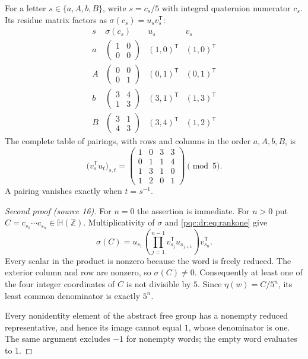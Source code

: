 \documentclass[11pt,letterpaper]{article}
\numberwithin{equation}{section}
\theoremstyle{definition}
\theoremstyle{remark}
\newcommand{\Z}{\mathbb Z}
\newcommand{\HH}{\mathbb H}
\begin{document}
For a letter $s\in\{a,A,b,B\}$, write $s=c_s/5$ with integral
quaternion numerator $c_s$. Its residue matrix factors as
$\sigma(c_s)=u_sv_s^{\mathsf T}$:
\begin{equation}
\begin{array}{c|c|c|c}
s&\sigma(c_s)&u_s&v_s\\ \hline
 a&\left(\begin{smallmatrix}1&0\\0&0\end{smallmatrix}\right)&(1,0)^{\mathsf T}&(1,0)^{\mathsf T}\\
 A&\left(\begin{smallmatrix}0&0\\0&1\end{smallmatrix}\right)&(0,1)^{\mathsf T}&(0,1)^{\mathsf T}\\
 b&\left(\begin{smallmatrix}3&4\\1&3\end{smallmatrix}\right)&(3,1)^{\mathsf T}&(1,3)^{\mathsf T}\\
 B&\left(\begin{smallmatrix}3&1\\4&3\end{smallmatrix}\right)&(3,4)^{\mathsf T}&(1,2)^{\mathsf T}
\end{array}
\label{pqc:dr:eq:rankone}
\end{equation}
The complete table of pairings, with rows and columns in the order
$a,A,b,B$, is
\begin{equation}
 \bigl(v_s^{\mathsf T}u_t\bigr)_{s,t}=
 \begin{pmatrix}
 1&0&3&3\\
 0&1&1&4\\
 1&3&1&0\\
 1&2&0&1
 \end{pmatrix}\pmod5.
 \label{pqc:dr:eq:pairings}
\end{equation}
A pairing vanishes exactly when $t=s^{-1}$.
\begin{proof}[Second proof (source 16)]
For $n=0$ the assertion is immediate. For $n>0$ put
$C=c_{s_1}\cdots c_{s_n}\in\HH(\Z)$. Multiplicativity of $\sigma$ and
\eqref{pqc:dr:eq:rankone} give
\[
 \sigma(C)=u_{s_1}
 \left(\prod_{j=1}^{n-1}v_{s_j}^{\mathsf T}u_{s_{j+1}}\right)
 v_{s_n}^{\mathsf T}.
\]
Every scalar in the product is nonzero because the word is freely reduced.
The exterior column and row are nonzero, so $\sigma(C)\ne0$.
Consequently at least one of the four integer coordinates of $C$ is not
divisible by $5$. Since $\eta(w)=C/5^n$, its least common denominator
is exactly $5^n$.

Every nonidentity element of the abstract free group has a nonempty
reduced representative, and hence its image cannot equal $1$, whose
denominator is one. The same argument excludes $-1$ for nonempty words;
the empty word evaluates to $1$.
\end{proof}
\end{document}
